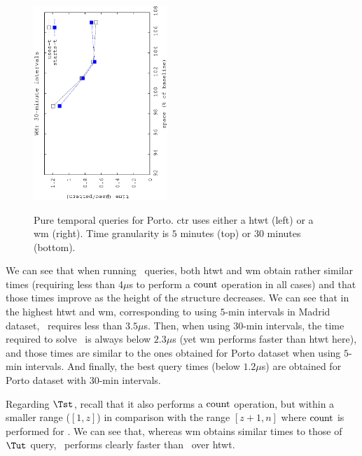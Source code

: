 \begin{figure}[!ht]
\begin{center}
				{\includegraphics[angle=-90,width=0.45\textwidth]{figures_synt/porto_t30mwm.eps}}
		\end{center}
		\vspace{-0.5cm}
		\caption{Pure temporal queries for Porto. \acrshort{ctr} uses either a \acrlong{htwt} (left) or a \acrlong{wm} (right). 
			Time granularity is $5$ minutes (top) or $30$ minutes (bottom).}
		\label{fig:portost_topk}
	\end{figure}



	We can see that when running \Tut\ queries, both \gls{htwt} and \gls{wm} obtain rather similar times (requiring less than 4$\mu$s 
	to perform a $\operatorname{count}$ operation in all cases) and that those times improve as the height of the structure decreases. We can see 
	that in the highest \gls{htwt} and \gls{wm}, corresponding to using $5$-min intervals in Madrid dataset, \Tut\ requires less
	than $3.5\mu$s. Then, when using $30$-min intervals, the time required to solve \Tut\ is always below $2.3\mu$s (yet
	\gls{wm} performs faster than \gls{htwt} here), and those times are similar to the ones obtained for Porto dataset when
	using $5$-min intervals. And finally, the best query times (below $1.2\mu$s) are obtained for Porto dataset with 
	$30$-min intervals.

	Regarding $\Tst$, recall that it also performs a $\operatorname{count}$ operation, but within a smaller range ($[1,z]$) in comparison with the range
	$[z+1,n]$ where  $\operatorname{count}$ is performed for \Tut. We can see that, whereas \gls{wm} obtains similar times to those of 
	$\Tut$ query,  \Tst\ performs clearly faster than \Tut\ over \gls{htwt}.




